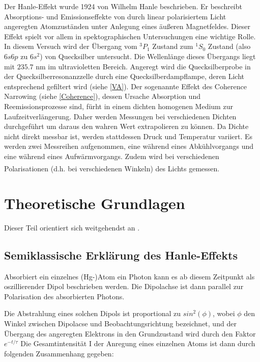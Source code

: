 \documentclass[12pt]{article}
\begin{document}
Der Hanle-Effekt wurde 1924 von Wilhelm Hanle beschrieben. Er beschreibt  Absorptions- und Emissionseffekte von durch linear polarisiertem Licht angeregten Atomzuständen  unter Anlegung eines äußeren Magnetfeldes. Dieser Effekt spielt vor allem in spektographischen Untersuchungen eine wichtige Rolle.  In diesem Versuch wird der Übergang vom  $^3P_1$ Zustand  zum  $^1S_0$ Zustand (also $6s6p$ zu $6s^2$) von Quecksilber untersucht. Die Wellenlänge dieses Übergangs liegt mit $235.7$ nm  im ultravioletten Bereich. Angeregt wird die Quecksilberprobe in der Quecksilberresonanzzelle durch eine Quecksilberdampflampe, deren Licht entsprechend gefiltert wird (siehe \ref{VA}). Der sogenannte Effekt des Coherence Narrowing (siehe \ref{Coherence}), dessen Ursache Absorption und Reemissionsprozesse sind, fürht in einem dichten homogenen Medium zur Laufzeitverlängerung. Daher werden Messungen bei verschiedenen Dichten durchgeführt um daraus den wahren Wert extrapolieren zu können. Da Dichte nicht direkt messbar ist, werden stattdessen Druck und Temperatur variiert. Es werden zwei Messreihen aufgenommen, eine während eines Abkühlvorgangs und eine während eines Aufwärmvorgangs. Zudem wird bei verschiedenen Polarisationen (d.h. bei verschiedenen Winkeln) des Lichts gemessen.\textsuperscript{\cite{anleitung}}



\newpage
\section{Theoretische Grundlagen}

Dieser Teil orientiert sich weitgehendst an \cite{anleitung}.

\subsection{Semiklassische Erklärung des Hanle-Effekts}

Absorbiert ein einzelnes (Hg-)Atom ein Photon kann es ab diesem Zeitpunkt als oszillierender Dipol beschrieben werden. Die Dipolachse ist dann parallel zur Polarisation des absorbierten Photons. 


Die Abstrahlung eines solchen Dipols ist proportional zu $sin^2(\phi) $, wobei $\phi$ den Winkel zwischen Dipolacse und Beobachtungsrichtung bezeichnet, und der Übergang des angeregten Elektrons in den Grundzustand wird durch den Faktor $e^{-t/\tau}$
Die Gesamtintensität I der Anregung eines einzelnen Atoms ist dann durch folgenden Zusammenhang gegeben:
\end{document}
